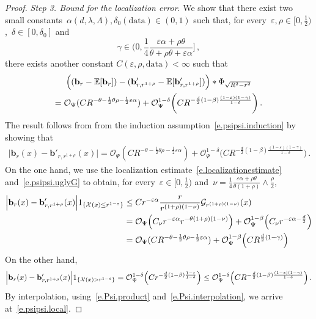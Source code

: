 \documentclass[11pt]{article} %
\numberwithin{equation}{section}
\theoremstyle{definition}
\newcommand{\eps}{\varepsilon}
\renewcommand{\b}{\ensuremath{\mathbf{b}}}
\newcommand{\ep}{\eps}
\newcommand{\E}{\mathbb{E}}
\newcommand{\X}{\mathcal{X}}
\renewcommand{\O}{\mathcal{O}}
\newcommand{\indc}{1}
\newcommand{\data}{\mathrm{data}}
\begin{document}
\begin{proof}
\smallskip 


\emph{Step 3. Bound for the localization error}. 
We show that there exist two small constants~$\alpha(d,\lambda,\Lambda),\delta_0(\data) \in (0,1)$ such that, for every~$\ep,\rho \in [0,\frac12)$,~$\delta \in [0,\delta_0]$ and
\begin{equation} \label{e.psipsi.gamma1}
\gamma 
\in 
\biggl( 0, \frac14 \frac{\ep \alpha + \rho \theta}{\theta + \rho \theta + \ep\alpha} \biggl]\,, 
\end{equation}
there exists another constant $C(\ep,\rho,\data) < \infty$ such that
\begin{multline}  \label{e.psipsi.local.buckle}
\Bigl( (\b_r - \E [ \b_r ]) - (\b'_{r,r^{1+\rho} } - \E [ \b'_{r,r^{1+\rho} } ] )  \Bigr) \ast \Phi_{\sqrt{R^2-r^2}} 
\\ 
= 
\O_{\Psi} (C R^{- \theta - \frac12 \theta \rho  - \frac12 \ep \alpha }) +  \O_{\Psi}^{1-\delta}\biggl(C R^{- \frac{d}{2}(1-\beta)  \frac{(1-\ep)(1 - \gamma)}{1-\delta}}  \biggr) 
\,.
\end{multline}
The result follows from from the induction assumption~\eqref{e.psipsi.induction} by showing that
\begin{align} \label{e.psipsi.local}
\Big| 
\b_r(x)  - \b'_{r,r^{1+\rho}}(x)
\Big|
= 
\O_{\Psi} (C R^{- \theta - \frac12 \theta \rho  - \frac12  \ep \alpha}) +  \O_{\Psi}^{1-\delta}\biggl(C R^{- \frac{d}{2}(1-\beta)  \frac{(1-\ep)(1 - \gamma)}{1-\delta}} \biggr) 
\,.
\end{align}
On the one hand, we use the localization estimate~\eqref{e.localizationestimate} and~\eqref{e.psipsi.uglyG} to obtain, for every~$\ep \in [0,\frac12)$ and~$\nu = \frac{1}{4} \frac{\ep \alpha+\rho \theta}{\theta(1+\rho)} \wedge \frac \rho2$, 
\begin{align} \notag  
\Big| 
\b_r(x)  - \b'_{r,r^{1+\rho}}(x)
\Big| 
\indc_{\{ \X(x) \leq r^{1- \ep}   \} }
&
\leq
C r^{-\ep \alpha} \frac{r}{r^{(1+\rho)(1-\nu)}}\mathcal{G}_{r^{(1+\rho)(1-\nu)}}(x)
\\ 
\notag &
= 
\O_{\Psi} \Bigl(C_\nu r^{-\ep \alpha} r^{- \theta(1+\rho)(1-\nu)}\Bigr)
+ 
\O_{\Psi}^{1-\beta}\Bigl( C_\nu r^{-\ep \alpha -\frac d2}\Bigr)
\\ 
\notag &
= 
 \O_{\Psi} (C R^{- \theta - \frac12 \theta \rho  - \frac12 \ep \alpha }) 
 + 
\O_{\Psi}^{1-\beta}\Bigl( C R^{\frac d2 (1-\gamma)}\Bigr)
\end{align}
On the other hand,
\begin{equation*}  
\Big| 
\b_r(x)  - \b'_{r,r^{1+\rho}}(x)
\Big| 
\indc_{\{ \X(x) > r^{1- \ep}   \} }
= 
\O_{\Psi}^{1-\delta}  \Bigl( C r^{-\frac d2(1-\beta)\frac{1-\ep}{1-\delta}}\Bigr) 
\leq 
\O_{\Psi}^{1-\delta}  \Bigl( C R^{- \frac{d}{2}(1-\beta)   \frac{(1-\ep)(1 - \gamma)}{1-\delta}}  \Bigr) 
\,.
\end{equation*}
By interpolation, using~\eqref{e.Psi.product} and~\eqref{e.Psi.interpolation}, we arrive at~\eqref{e.psipsi.local}. 


\end{proof}
\end{document}
